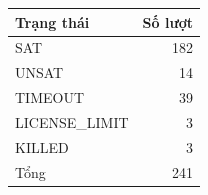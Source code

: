 \begin{tabular}{lr}
\toprule
Trạng thái & Số lượt \\
\midrule
SAT & 182 \\
UNSAT & 14 \\
TIMEOUT & 39 \\
LICENSE\_LIMIT & 3 \\
KILLED & 3 \\
\midrule
Tổng & 241 \\
\bottomrule
\end{tabular}
